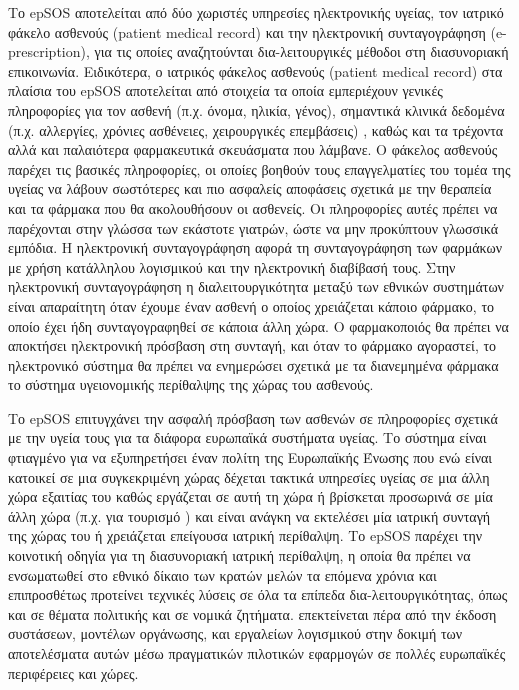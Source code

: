 		Το epSOS αποτελείται από δύο χωριστές υπηρεσίες ηλεκτρονικής υγείας, τον ιατρικό φάκελο ασθενούς (patient medical record) και την ηλεκτρονική συνταγογράφηση (e-prescription),  για τις οποίες αναζητούνται δια-λειτουργικές μέθοδοι στη διασυνοριακή επικοινωνία. Ειδικότερα, ο ιατρικός φάκελος ασθενούς  (patient medical record) στα πλαίσια του epSOS αποτελείται από στοιχεία τα οποία εμπεριέχουν γενικές πληροφορίες για τον ασθενή (π.χ. όνομα, ηλικία, γένος), σημαντικά κλινικά δεδομένα (π.χ. αλλεργίες, χρόνιες ασθένειες, χειρουργικές επεμβάσεις) , καθώς και τα τρέχοντα αλλά και παλαιότερα φαρμακευτικά σκευάσματα που λάμβανε. Ο φάκελος ασθενούς παρέχει τις βασικές πληροφορίες, οι οποίες βοηθούν τους επαγγελματίες του τομέα της υγείας να λάβουν σωστότερες και πιο ασφαλείς αποφάσεις σχετικά με την θεραπεία και τα φάρμακα που θα ακολουθήσουν οι ασθενείς. Οι πληροφορίες αυτές πρέπει να παρέχονται στην γλώσσα των εκάστοτε γιατρών, ώστε να μην προκύπτουν γλωσσικά εμπόδια. Η ηλεκτρονική συνταγογράφηση αφορά τη συνταγογράφηση των φαρμάκων με χρήση κατάλληλου λογισμικού και την ηλεκτρονική διαβίβασή τους. Στην ηλεκτρονική συνταγογράφηση η διαλειτουργικότητα μεταξύ των εθνικών συστημάτων είναι απαραίτητη όταν έχουμε έναν ασθενή ο οποίος χρειάζεται κάποιο φάρμακο, το οποίο έχει ήδη συνταγογραφηθεί σε κάποια άλλη χώρα.  Ο φαρμακοποιός θα πρέπει να αποκτήσει ηλεκτρονική πρόσβαση στη συνταγή, και όταν το φάρμακο αγοραστεί, το ηλεκτρονικό σύστημα θα πρέπει να ενημερώσει σχετικά με τα διανεμημένα φάρμακα το σύστημα υγειονομικής περίθαλψης της χώρας του ασθενούς. \cite{epSOS}
		
		 Το epSOS επιτυγχάνει την ασφαλή πρόσβαση των ασθενών σε πληροφορίες σχετικά με την υγεία τους για τα διάφορα ευρωπαϊκά συστήματα υγείας. Το σύστημα είναι φτιαγμένο για να εξυπηρετήσει έναν πολίτη της Ευρωπαϊκής Ένωσης  που ενώ είναι κατοικεί σε μια συγκεκριμένη χώρας δέχεται τακτικά υπηρεσίες υγείας σε μια άλλη χώρα εξαιτίας του καθώς εργάζεται σε αυτή τη χώρα ή βρίσκεται προσωρινά σε μία άλλη χώρα (π.χ. για τουρισμό ) και είναι ανάγκη να εκτελέσει μία ιατρική συνταγή της χώρας του ή χρειάζεται επείγουσα ιατρική περίθαλψη. Το epSOS παρέχει την κοινοτική οδηγία για τη διασυνοριακή ιατρική περίθαλψη, η οποία θα πρέπει να ενσωματωθεί στο εθνικό δίκαιο των κρατών μελών τα επόμενα χρόνια και επιπροσθέτως προτείνει τεχνικές λύσεις σε όλα τα επίπεδα δια-λειτουργικότητας, όπως και σε θέματα πολιτικής και σε νομικά ζητήματα. επεκτείνεται πέρα από την έκδοση συστάσεων, μοντέλων οργάνωσης, και εργαλείων λογισμικού  στην  δοκιμή των αποτελέσματα αυτών μέσω πραγματικών πιλοτικών εφαρμογών σε πολλές ευρωπαϊκές περιφέρειες και χώρες.
		 


